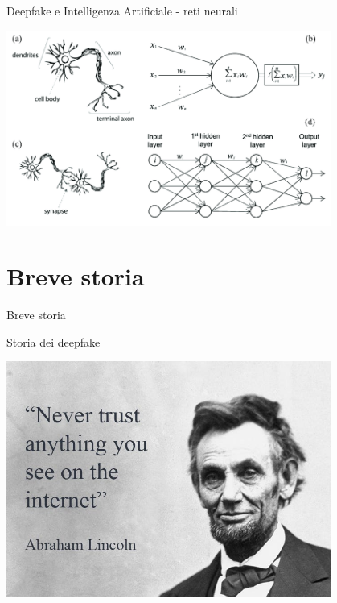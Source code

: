 \documentclass[11pt]{beamer}
\begin{document}
\begin{frame}{Deepfake e Intelligenza Artificiale - reti neurali \cite{NN}}

\begin{center}
\includegraphics[width=0.8\textwidth]{Pic/Neural_network.png}
\end{center}

\end{frame}





\section{Breve storia}

\begin{frame}
\begin{center}
\Huge
Breve storia
\end{center}
\end{frame}

\begin{frame}{Storia dei deepfake }

\begin{center}
\includegraphics[width=0.8\textwidth]{Pic/lincon.jpg}
\end{center}

\end{frame}
\end{document}
